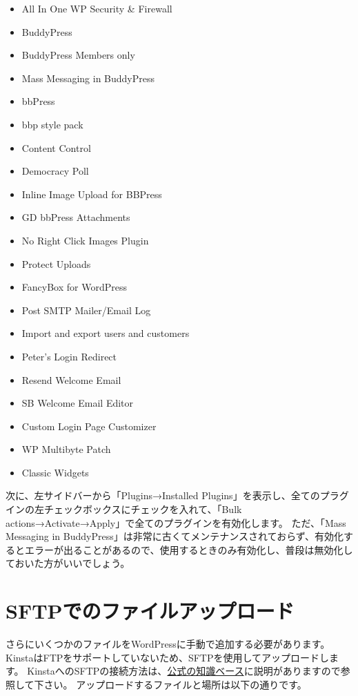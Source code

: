 \documentclass[titlepage,10pt,a4paper,uplatex]{jsbook}
\begin{document}
\begin{itemize}
\item All In One WP Security \& Firewall
\item BuddyPress
\item BuddyPress Members only
\item Mass Messaging in BuddyPress
\item bbPress
\item bbp style pack
\item Content Control
\item Democracy Poll
\item Inline Image Upload for BBPress
\item GD bbPress Attachments
\item No Right Click Images Plugin
\item Protect Uploads
\item FancyBox for WordPress
\item Post SMTP Mailer/Email Log
\item Import and export users and customers
\item Peter's Login Redirect
\item Resend Welcome Email
\item SB Welcome Email Editor
\item Custom Login Page Customizer
\item WP Multibyte Patch
\item Classic Widgets
\end{itemize}

次に、左サイドバーから「Plugins→Installed Plugins」を表示し、全てのプラグインの左チェックボックスにチェックを入れて、「Bulk actions→Activate→Apply」で全てのプラグインを有効化します。
ただ、「Mass Messaging in BuddyPress」は非常に古くてメンテナンスされておらず、有効化するとエラーが出ることがあるので、使用するときのみ有効化し、普段は無効化しておいた方がいいでしょう。

\section{SFTPでのファイルアップロード}

さらにいくつかのファイルをWordPressに手動で追加する必要があります。
KinstaはFTPをサポートしていないため、SFTPを使用してアップロードします。
KinstaへのSFTPの接続方法は、\href{https://kinsta.com/jp/knowledgebase/how-to-use-sftp/}{公式の知識ベース}に説明がありますので参照して下さい。
アップロードするファイルと場所は以下の通りです。
\end{document}
